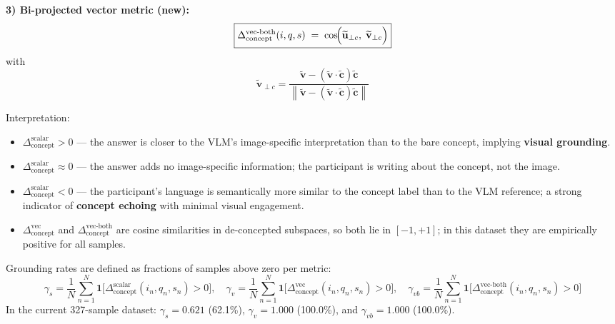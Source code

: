\documentclass[12pt,a4paper]{article}
\newcommand{\SACs}{\ensuremath{\Delta_{\text{concept}}^{\text{scalar}}}}
\newcommand{\SACv}{\ensuremath{\Delta_{\text{concept}}^{\text{vec}}}}
\newcommand{\SACvb}{\ensuremath{\Delta_{\text{concept}}^{\text{vec-both}}}}
\begin{document}
\textbf{3) Bi-projected vector metric (new):}
\begin{equation}
      \boxed{\SACvb{}(i,q,s)
            \;=\;
            \cos\!\Bigl(\widetilde{\mathbf{u}}_{\perp c},\; \widetilde{\mathbf{v}}_{\perp c}\Bigr)}
      \label{eq:sac_vec_both}
\end{equation}
with
\begin{equation}
      \widetilde{\mathbf{v}}_{\perp c}
      =
      \frac{\widetilde{\mathbf{v}} - (\widetilde{\mathbf{v}}\!\cdot\!\widetilde{\mathbf{c}})\widetilde{\mathbf{c}}}
                   {\left\|\widetilde{\mathbf{v}} - (\widetilde{\mathbf{v}}\!\cdot\!\widetilde{\mathbf{c}})\widetilde{\mathbf{c}}\right\|}
\end{equation}

Interpretation:
\begin{itemize}[noitemsep]
      \item $\SACs{} > 0$ --- the answer is closer to the VLM's image-specific interpretation
                        than to the bare concept, implying \textbf{visual grounding}.
      \item $\SACs{} \approx 0$ --- the answer adds no image-specific information; the
                        participant is writing about the concept, not the image.
      \item $\SACs{} < 0$ --- the participant's language is semantically more similar to the
                        concept label than to the VLM reference; a strong indicator of
                        \textbf{concept echoing} with minimal visual engagement.
      \item $\SACv{}$ and $\SACvb{}$ are cosine similarities in de-concepted subspaces,
                        so both lie in $[-1,+1]$; in this dataset they are empirically positive for all
                        samples.
\end{itemize}

Grounding rates are defined as fractions of samples above zero per metric:
\begin{equation}
      \gamma_s
            = \frac{1}{N}
                  \sum_{n=1}^{N}
                  \mathbf{1}\!\bigl[\SACs{}(i_n, q_n, s_n) > 0\bigr],
      \quad
      \gamma_v
            = \frac{1}{N}\sum_{n=1}^{N}\mathbf{1}\!\bigl[\SACv{}(i_n, q_n, s_n) > 0\bigr],
      \quad
      \gamma_{vb}
            = \frac{1}{N}\sum_{n=1}^{N}\mathbf{1}\!\bigl[\SACvb{}(i_n, q_n, s_n) > 0\bigr]
      \label{eq:gamma_multi}
\end{equation}
In the current 327-sample dataset:
$\gamma_s=0.621$ (62.1\%), $\gamma_v=1.000$ (100.0\%), and $\gamma_{vb}=1.000$ (100.0\%).
\end{document}
